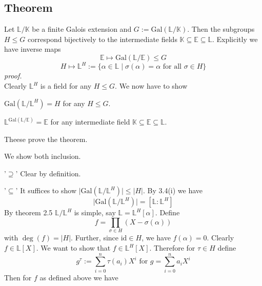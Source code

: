 \documentclass[12pt]{book}
\begin{document}
\begin{spacing}{1.3}
\subsection{Theorem } %
\titleformat{\subsection}{\normalfont\normalsize\bfseries}{}{0em}{#1 \thesubsection}
Let $\mathbb{L}/\mathbb{K}$ be a finite Galois extension and $G:=\textrm{Gal}(\mathbb{L}/\mathbb{K})$. Then the subgroups $H\leqslant G$ correspond bijectively to the intermediate fields $\mathbb{K} \subseteq \mathbb{E} \subseteq \mathbb{L}$. Explicitly we have inverse maps
$$ \mathbb{E} \mapsto \textrm{Gal}(\mathbb{L}/\mathbb{E}) \leqslant G$$
$$ H \mapsto \mathbb{L}^H := \{ \alpha \in \mathbb{L} \mid \sigma(\alpha) =\alpha \textrm{ for all } \sigma \in H \}$$
\textit{proof.}\\
Clearly $\mathbb{L}^H$ is a field for any $H \leqslant G$. We now have to show
\begin{compactenum}
\item $\textrm{Gal}(\mathbb{L}/\mathbb{L}^H) = H$ for any $H \leqslant G$.
\item $\mathbb{L}^{\textrm{Gal}(\mathbb{L}/\mathbb{E})} = \mathbb{E}$ for any intermediate field $\mathbb{K} \subseteq \mathbb{E} \subseteq \mathbb{L}$.
\end{compactenum}
Theese prove the theorem.
\begin{compactenum}
\item We show both inclusion.
\begin{compactitem}
\item['$\supseteq$'] Clear by definition.
\item['$\subseteq$'] It suffices to show $\vert \textrm{Gal}(\mathbb{L}/\mathbb{L}^H) \vert \leqslant \vert H \vert$.
By 3.4(i) we have $$\vert \textrm{Gal}(\mathbb{L}/\mathbb{L}^H) \vert = [\mathbb{L}:\mathbb{L}^H]$$By theorem 2.5 $\mathbb{L}/\mathbb{L}^H$ is simple, say $\mathbb{L}=\mathbb{L}^H[\alpha]$. Define $$f=\prod_{\sigma \in H} (X-\sigma(\alpha))$$ with $\deg(f)=\vert H \vert$. Further, since $\textrm{id} \in H$, we have $f(\alpha)=0$. Clearly $f \in \mathbb{L}[X]$. We want to show that $f \in \mathbb{L}^H[X]$. Therefore for $\tau \in H$ define $$g^{\tau}:=\sum_{i=0}^n \tau(a_i) X^{i} \textrm{ for }g=\sum_{i=0}^n a_i X^{i}$$Then for $f$ as defined above we have

\end{compactitem}
\end{compactenum}
\end{spacing}
\end{document}
